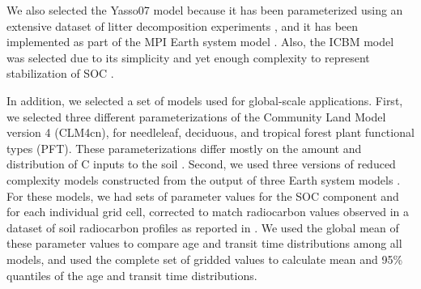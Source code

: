 \documentclass[draft,linenumbers]{agujournal}
\begin{document}
We also selected the Yasso07 model because it has been parameterized using an extensive dataset of litter decomposition experiments \citep{Tuomi2009}, and it has been implemented as part of the MPI Earth system model \citep{Goll2015}. Also, the ICBM model was selected due to its simplicity and yet enough complexity to represent stabilization of SOC \citep{Andren1997}. 

In addition, we selected a set of models used for global-scale applications. First, we selected three different parameterizations of the Community Land Model version 4 (CLM4cn), for needleleaf, deciduous, and tropical forest plant functional types (PFT). These parameterizations differ mostly on the amount and distribution of C inputs to the soil \citep{Wieder2014}. Second, we used three versions of reduced complexity models constructed from the output of three Earth system models \citep{He2016}. For these models, we had sets of parameter values for the SOC component and for each individual grid cell, corrected to match radiocarbon values observed in a dataset of soil radiocarbon profiles as reported in \citet{He2016}. We used the global mean of these parameter values to compare age and transit time distributions among all models, and used the complete set of gridded values to calculate mean and 95\% quantiles of the age and transit time distributions. 
\end{document}
